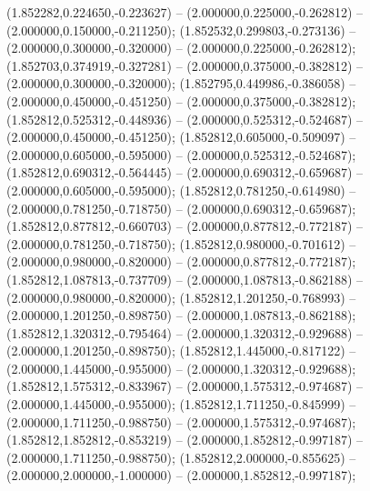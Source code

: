  (1.852282,0.224650,-0.223627) -- (2.000000,0.225000,-0.262812) -- (2.000000,0.150000,-0.211250);
 (1.852532,0.299803,-0.273136) -- (2.000000,0.300000,-0.320000) -- (2.000000,0.225000,-0.262812);
 (1.852703,0.374919,-0.327281) -- (2.000000,0.375000,-0.382812) -- (2.000000,0.300000,-0.320000);
 (1.852795,0.449986,-0.386058) -- (2.000000,0.450000,-0.451250) -- (2.000000,0.375000,-0.382812);
 (1.852812,0.525312,-0.448936) -- (2.000000,0.525312,-0.524687) -- (2.000000,0.450000,-0.451250);
 (1.852812,0.605000,-0.509097) -- (2.000000,0.605000,-0.595000) -- (2.000000,0.525312,-0.524687);
 (1.852812,0.690312,-0.564445) -- (2.000000,0.690312,-0.659687) -- (2.000000,0.605000,-0.595000);
 (1.852812,0.781250,-0.614980) -- (2.000000,0.781250,-0.718750) -- (2.000000,0.690312,-0.659687);
 (1.852812,0.877812,-0.660703) -- (2.000000,0.877812,-0.772187) -- (2.000000,0.781250,-0.718750);
 (1.852812,0.980000,-0.701612) -- (2.000000,0.980000,-0.820000) -- (2.000000,0.877812,-0.772187);
 (1.852812,1.087813,-0.737709) -- (2.000000,1.087813,-0.862188) -- (2.000000,0.980000,-0.820000);
 (1.852812,1.201250,-0.768993) -- (2.000000,1.201250,-0.898750) -- (2.000000,1.087813,-0.862188);
 (1.852812,1.320312,-0.795464) -- (2.000000,1.320312,-0.929688) -- (2.000000,1.201250,-0.898750);
 (1.852812,1.445000,-0.817122) -- (2.000000,1.445000,-0.955000) -- (2.000000,1.320312,-0.929688);
 (1.852812,1.575312,-0.833967) -- (2.000000,1.575312,-0.974687) -- (2.000000,1.445000,-0.955000);
 (1.852812,1.711250,-0.845999) -- (2.000000,1.711250,-0.988750) -- (2.000000,1.575312,-0.974687);
 (1.852812,1.852812,-0.853219) -- (2.000000,1.852812,-0.997187) -- (2.000000,1.711250,-0.988750);
 (1.852812,2.000000,-0.855625) -- (2.000000,2.000000,-1.000000) -- (2.000000,1.852812,-0.997187);
